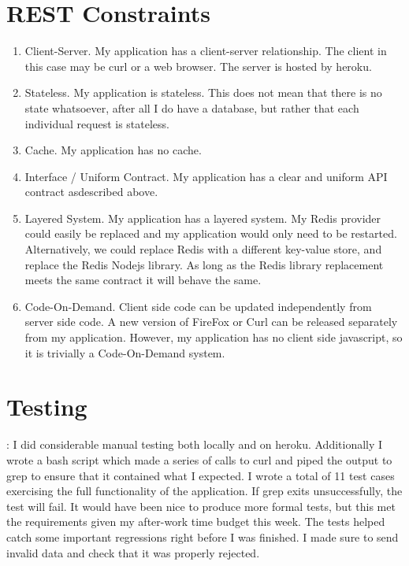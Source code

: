 \documentclass[12pt]{article}
\begin{document}
\section{REST Constraints}
\begin{enumerate}
\item Client-Server. My application has a client-server relationship. The client in this case may be curl or a web browser. The server is hosted by heroku.
\item Stateless. My application is stateless. This does not mean that there is no state whatsoever, after all I do have a database, but rather that each individual request is stateless.
\item Cache. My application has no cache.
\item Interface / Uniform Contract. My application has a clear and uniform API contract asdescribed above.
\item Layered System. My application has a layered system. My Redis provider could easily be replaced and my application would only need to be restarted. Alternatively, we could replace Redis with a different key-value store, and replace the Redis Nodejs library. As long as the Redis library replacement meets the same contract it will behave the same.
\item Code-On-Demand. Client side code can be updated independently from server side code. A new version of FireFox or Curl can be released separately from my application. However, my application has no client side javascript, so it is trivially a Code-On-Demand system.
\end{enumerate}


\section{Testing}:
I did considerable manual testing both locally and on heroku. Additionally I wrote a bash script which made a series of calls to curl and piped the output to grep to ensure that it contained what I expected. I wrote a total of 11 test cases exercising the full functionality of the application. If grep exits unsuccessfully, the test will fail. It would have been nice to produce more formal tests, but this met the requirements given my after-work time budget this week. The tests helped catch some important regressions right before I was finished. I made sure to send invalid data and check that it was properly rejected.
\end{document}
